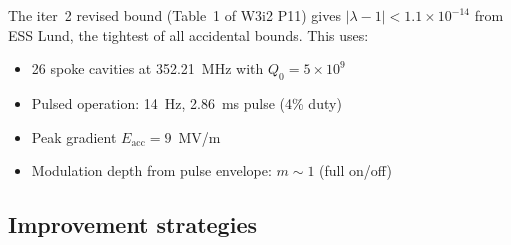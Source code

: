 \documentclass[11pt]{article}
\theoremstyle{definition}
\theoremstyle{remark}
\newcommand{\lam}{\lambda}
\begin{document}
The iter~2 revised bound (Table~1 of W3i2 P11) gives
$|\lam-1| < 1.1\times10^{-14}$ from ESS Lund, the tightest of all
accidental bounds. This uses:
\begin{itemize}[nosep]
\item 26 spoke cavities at 352.21~MHz with $Q_0 = 5\times10^9$
\item Pulsed operation: 14~Hz, 2.86~ms pulse (4\% duty)
\item Peak gradient $E_{\mathrm{acc}} = 9$~MV/m
\item Modulation depth from pulse envelope: $m \sim 1$ (full on/off)
\end{itemize}

\subsection{Improvement strategies}
\end{document}
